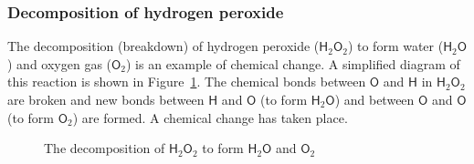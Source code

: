 \subsubsection*{Decomposition of hydrogen peroxide}
      \label{m38709*id62788}The decomposition (breakdown) of hydrogen peroxide ($\mathsf{H}_{2}\mathsf{O}_{2}$) to form water ($\mathsf{H}_{2}\mathsf{O}$) and oxygen gas ($\mathsf{O}_{2}$) is an example of chemical change. A simplified diagram of this reaction is shown in Figure~\ref{fig:chemical change:decomposition}. The chemical bonds between $\mathsf{O}$ and $\mathsf{H}$ in $\mathsf{H}_{2}\mathsf{O}_{2}$ are broken and new bonds between $\mathsf{H}$ and $\mathsf{O}$ (to form $\mathsf{H}_{2}\mathsf{O}$) and between $\mathsf{O}$ and $\mathsf{O}$ (to form $\mathsf{O}_{2}$) are formed. A chemical change has taken place.\par 
    \setcounter{subfigure}{0}
\begin{figure}[h]
\begin{center}
\end{center}
\caption{The decomposition of $\mathsf{H}_{2}\mathsf{O}_{2}$ to form $\mathsf{H}_{2}\mathsf{O}$ and $\mathsf{O}_{2}$}
\label{fig:chemical change:decomposition}
\end{figure}     
\par
\label{m38709*secfhsst!!!underscore!!!id163}
